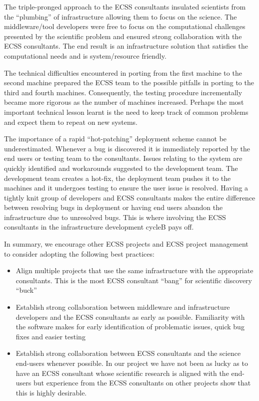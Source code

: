 \documentclass{sig-alternate}
\begin{document}
The triple-pronged approach to the ECSS consultants insulated scientists from
the ``plumbing'' of infrastructure allowing them to focus on the science. The
middleware/tool developers were free to focus on the computational challenges
presented by the scientific problem and ensured strong collaboration with the
ECSS consultants. The end result is an infrastructure solution that satisfies
the computational needs and is system/resource friendly.

The technical difficulties encountered in porting from the first
machine to the second machine prepared the ECSS team to the possible
pitfalls in porting to the third and fourth machines. Consequently,
the testing procedure incrementally became more rigorous as the number
of machines increased. Perhaps the most important technical lesson
learnt is the need to keep track of common problems and expect them to
repeat on new systems.

The importance of a rapid ``hot-patching'' deployment scheme cannot be
underestimated. Whenever a bug is discovered it is immediately
reported by the end users or testing team to the consultants. Issues
relating to the system are quickly identified and workarounds
suggested to the development team. The development team creates a
hot-fix, the deployment team pushes it to the machines and it
undergoes testing to ensure the user issue is resolved. Having a
tightly knit group of developers and ECSS consultants makes the entire
difference between resolving bugs in deployment or having end users
abandon the infrastructure due to unresolved bugs. This is where
involving the ECSS consultants in the infrastructure development cycleB
pays off.

In summary, we encourage other ECSS projects and ECSS project
management to consider adopting the following best practices:
\begin{itemize}
 \item Align multiple projects that use the same infrastructure
 with the appropriate consultants. This is the most ECSS consultant
 ``bang'' for scientific discovery ``buck''
 \item Establish strong collaboration between middleware and infrastructure
 developers and the ECSS consultants as early as possible. Familiarity with the software makes for early
 identification of problematic issues, quick bug fixes and easier testing
 \item Establish strong collaboration between ECSS consultants and the science
 end-users whenever possible. In our project we have not been as lucky as to
 have an ECSS consultant whose scientific research is aligned with the end-users
 but experience from the ECSS consultants on other projects show that this is highly
 desirable.
\end{itemize}
\end{document}
